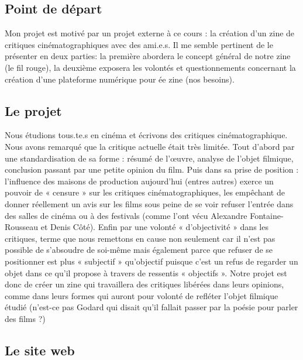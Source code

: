 \documentclass[12pt,french,letterpaper]{article}
\begin{document}
\normalsize{\hypertarget{point-de-duxe9part}{%
\subsection{Point de départ}\label{point-de-duxe9part}}

Mon projet est motivé par un projet externe à ce cours : la création
d'un zine de critiques cinématographiques avec des ami.e.s. Il me semble
pertinent de le présenter en deux parties: la première abordera le
concept général de notre zine (le fil rouge), la deuxième exposera les
volontés et questionnements concernant la création d'une plateforme
numérique pour ée zine (nos besoins).

\hypertarget{le-projet}{%
\subsection{Le projet}\label{le-projet}}

Nous étudions tous.te.s en cinéma et écrivons des critiques
cinématographique. Nous avons remarqué que la critique actuelle était
très limitée. Tout d'abord par une standardisation de sa forme : résumé
de l'œuvre, analyse de l'objet filmique, conclusion passant par une
petite opinion du film. Puis dans sa prise de position : l'influence des
maisons de production aujourd'hui (entres autres) exerce un pouvoir de «
censure » sur les critiques cinématographiques, les empêchant de donner
réellement un avis sur les films sous peine de se voir refuser l'entrée
dans des salles de cinéma ou à des festivals (comme l'ont vécu Alexandre
Fontaine-Rousseau et Denis Côté). Enfin par une volonté « d'objectivité
» dans les critiques, terme que nous remettons en cause non seulement
car il n'est pas possible de s'absoudre de soi-même mais également parce
que refuser de se positionner est plus « subjectif » qu'objectif puisque
c'est un refus de regarder un objet dans ce qu'il propose à travers de
ressentis « objectifs ». Notre projet est donc de créer un zine qui
travaillera des critiques libérées dans leurs opinions, comme dans leurs
formes qui auront pour volonté de refléter l'objet filmique étudié
(n'est-ce pas Godard qui disait qu'il fallait passer par la poésie pour
parler des films ?)

\hypertarget{le-site-web}{%
\subsection{Le site web}\label{le-site-web}}

}
\end{document}
